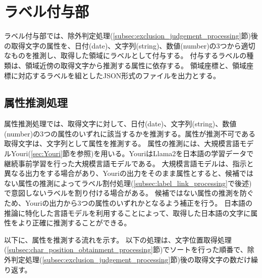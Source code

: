 \section{ラベル付与部}\label{sec:label_link_part}
ラベル付与部では、除外判定処理(\ref{subsec:exclusion_judgement_processing}節)後の取得文字の属性を、日付(date)、文字列(string)、数値(number)の3つから適切なものを推測し、取得した領域にラベルとして付与する。
付与するラベルの種類は、領域近傍の取得文字から推測する属性に依存する。
領域座標と、領域座標に対応するラベルを組としたJSON形式のファイルを出力とする。


\subsection{属性推測処理}\label{subsec:att_prediction_processing}
属性推測処理では、取得文字に対して、日付(date)、文字列(string)、数値(number)の3つの属性のいずれに該当するかを推測する。属性が推測不可である取得文字は、文字列として属性を推測する。
属性の推測には、大規模言語モデルYouri(\ref{sec:Youri}節を参照)を用いる。YouriはLlama2を日本語の学習データで継続事前学習を行った大規模言語モデルである。
大規模言語モデルは、指示と異なる出力をする場合があり、Youriの出力をそのまま属性とすると、候補ではない属性の推測によってラベル割付処理(\ref{subsec:label_link_processing}で後述)で意図しないラベルを割り付ける場合がある。
候補ではない属性の推測を防ぐため、Youriの出力から3つの属性のいずれかとなるよう補正を行う。
日本語の推論に特化した言語モデルを利用することによって、取得した日本語の文字に属性をより正確に推測することができる。

以下に、属性を推測する流れを示す。
以下の処理は、文字位置取得処理(\ref{subsec:char_position_obtainment_processing}節)でソートを行った順番で、除外判定処理(\ref{subsec:exclusion_judgement_processing}節)後の取得文字の数だけ繰り返す。

